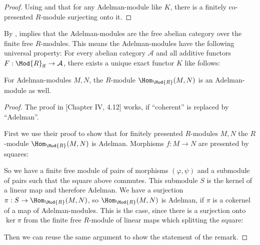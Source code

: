 \begin{proof}
   Using  and that for any Adelman-module like $K$, there is a finitely co-presented $R$-module surjecting onto it. 
\end{proof}

\begin{remark}
  By \cite[Theorem 1.15]{adelman-construction},  implies that the Adelman-modules are the free abelian category over the finite free $R$-modules.
  This means the Adelman-modules have the following universal property:
  For every abelian category $\mathcal{A}$ and all additive functors $F:\Mod{R}_{\mathrm{ff}}\to \mathcal{A}$, there exists a unique exact functor $K$ like follows:
  \begin{center}
\end{center}
\end{remark}

\begin{remark}
  \label{hom-closure}
  For Adelman-modules $M,N$, the $R$-module $\Hom_{\Mod{R}}(M,N)$ is an Adelman-module as well.
\end{remark}

\begin{proof}
  The proof in \cite{lombardi-quitte}[Chapter IV, 4.12] works, if ``coherent'' is replaced by ``Adelman''.
  
  First we use their proof to show that for finitely presented $R$-modules $M,N$ the $R$-module $\Hom_{\Mod{R}}(M,N)$ is Adelman. Morphisms $f:M\to N$ are presented by squares:
  \begin{center}
\end{center}
  So we have a finite free module of pairs of morphisms $(\varphi,\psi)$ and a submodule of pairs such that the square above commutes.
  This submodule $S$ is the kernel of a linear map and therefore Adelman.
  We have a surjection $\pi:S\to \Hom_{\Mod{R}}(M,N)$, so $\Hom_{\Mod{R}}(M,N)$ is Adelman,
  if $\pi$ is a cokernel of a map of Adelman-modules.
  This is the case, since there is a surjection onto $\ker{\pi}$ from the finite free $R$-module of linear maps which splitting the square:
  \begin{center}
\end{center}
  Then we can reuse the same argument to show the statement of the remark.
\end{proof}


